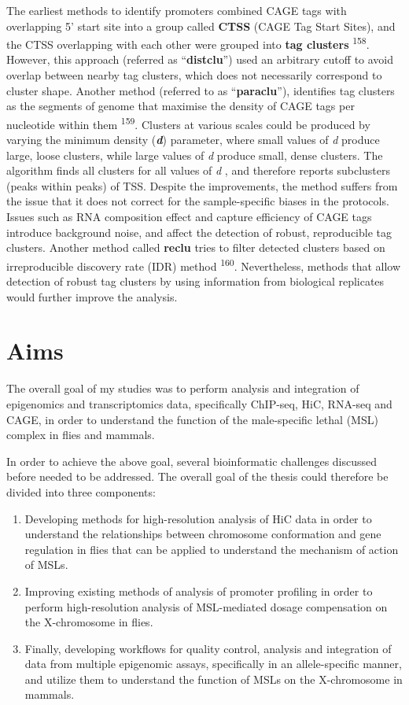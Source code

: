 \documentclass[11pt,twoside]{MPIthesis}
\theoremstyle{definition}
\theoremstyle{definition}
\theoremstyle{definition}
\theoremstyle{remark}
\begin{document}
The earliest methods to identify promoters combined CAGE tags with
overlapping 5' start site into a group called \textbf{CTSS} (CAGE Tag
Start Sites), and the CTSS overlapping with each other were grouped into
\textbf{tag clusters} \textsuperscript{158}. However, this approach
(referred as ``\textbf{distclu}'') used an arbitrary cutoff to avoid
overlap between nearby tag clusters, which does not necessarily
correspond to cluster shape. Another method (referred to as
``\textbf{paraclu}''), identifies tag clusters as the segments of genome
that maximise the density of CAGE tags per nucleotide within them
\textsuperscript{159}. Clusters at various scales could be produced by
varying the minimum density (\textbf{\emph{d}}) parameter, where small
values of \emph{d} produce large, loose clusters, while large values of
\emph{d} produce small, dense clusters. The algorithm finds all clusters
for all values of \emph{d} , and therefore reports subclusters (peaks
within peaks) of TSS. Despite the improvements, the method suffers from
the issue that it does not correct for the sample-specific biases in the
protocols. Issues such as RNA composition effect and capture efficiency
of CAGE tags introduce background noise, and affect the detection of
robust, reproducible tag clusters. Another method called \textbf{reclu}
tries to filter detected clusters based on irreproducible discovery rate
(IDR) method \textsuperscript{160}. Nevertheless, methods that allow
detection of robust tag clusters by using information from biological
replicates would further improve the analysis.

\clearpage

\section{Aims}\label{aims}

The overall goal of my studies was to perform analysis and integration
of epigenomics and transcriptomics data, specifically ChIP-seq, HiC,
RNA-seq and CAGE, in order to understand the function of the
male-specific lethal (MSL) complex in flies and mammals.

In order to achieve the above goal, several bioinformatic challenges
discussed before needed to be addressed. The overall goal of the thesis
could therefore be divided into three components:
\begin{enumerate}
\def\labelenumi{\arabic{enumi}.}
\item
  Developing methods for high-resolution analysis of HiC data in order
  to understand the relationships between chromosome conformation and
  gene regulation in flies that can be applied to understand the
  mechanism of action of MSLs.
\item
  Improving existing methods of analysis of promoter profiling in order
  to perform high-resolution analysis of MSL-mediated dosage
  compensation on the X-chromosome in flies.
\item
  Finally, developing workflows for quality control, analysis and
  integration of data from multiple epigenomic assays, specifically in
  an allele-specific manner, and utilize them to understand the function
  of MSLs on the X-chromosome in mammals.
\end{enumerate}
\end{document}
